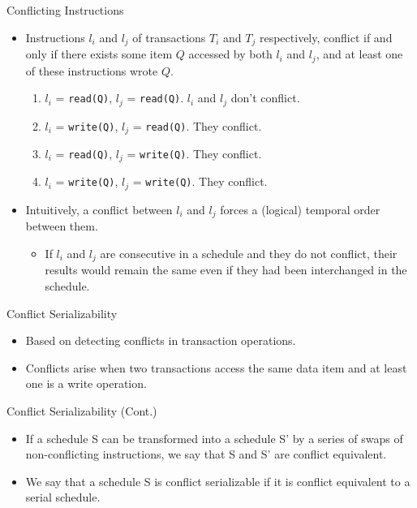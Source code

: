 \documentclass[aspectratio=169]{beamer}
\begin{document}
\begin{frame}{Conflicting Instructions}
    \begin{itemize}
        \item Instructions $l_i$ and $l_j$ of transactions $T_i$ and $T_j$ respectively, conflict if and only if there exists some item $Q$ accessed by both $l_i$ and $l_j$, and at least one of these instructions wrote $Q$.
            \begin{enumerate}
                \item $l_i$ = \texttt{read(Q)}, $l_j$ = \texttt{read(Q)}. $l_i$ and $l_j$ don't conflict.
                \item $l_i$ = \texttt{write(Q)}, $l_j$ = \texttt{read(Q)}. They conflict.
                \item $l_i$ = \texttt{read(Q)}, $l_j$ = \texttt{write(Q)}. They conflict.
                \item $l_i$ = \texttt{write(Q)}, $l_j$ = \texttt{write(Q)}. They conflict.
            \end{enumerate}

        \item Intuitively, a conflict between $l_i$ and $l_j$ forces a (logical) temporal order between them.
            \begin{itemize}
                \item If $l_i$ and $l_j$ are consecutive in a schedule and they do not conflict, their results would remain the same even if they had been interchanged in the schedule.
            \end{itemize}

    \end{itemize}
\end{frame}

\begin{frame}{Conflict Serializability}
    \begin{itemize}
        \item Based on detecting conflicts in transaction operations.
        \item Conflicts arise when two transactions access the same data item and at least one is a write operation.
    \end{itemize}
\end{frame}

\begin{frame}{Conflict Serializability (Cont.)}
    \begin{itemize}
        \item If a schedule S can be transformed into a schedule S' by a series of swaps of non-conflicting instructions, we say that S and S' are conflict equivalent.
        \item We say that a schedule S is conflict serializable if it is conflict equivalent to a serial schedule.
    \end{itemize}
\end{frame}
\end{document}
